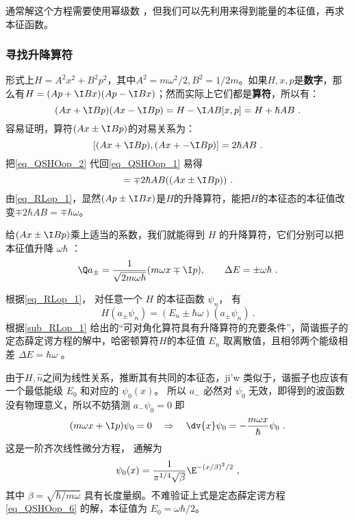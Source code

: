 通常解这个方程需要使用幂级数%
，但我们可以先利用来得到能量的本征值，再求本征函数。


\subsubsection{寻找升降算符}

形式上$H=A^2x^2+B^2p^2$，其中$A^2=m\omega^2/2, B^2=1/2m$。如果$H, x, p$是\textbf{数字}，那么有$H = (Ap+\I Bx)(Ap-\I Bx)$；然而实际上它们都是\textbf{算符}，所以有：
\begin{equation}\label{eq_QSHOop_1}
(Ax+\I Bp)(Ax-\I Bp) = H-\I AB[x, p] = H+\hbar AB~.
\end{equation}
容易证明，算符$(Ax\pm\I Bp)$的对易关系为：
\begin{equation}\label{eq_QSHOop_2}
[(Ax+\I Bp), (Ax+-\I Bp)] = 2\hbar AB~.
\end{equation}
把\autoref{eq_QSHOop_2} 代回\autoref{eq_QSHOop_1} 易得
\begin{equation}
[H, (Ax\pm\I Bp) = [H+ \hbar AB, (Ax\pm\I Bp)] = \mp 2\hbar AB ((Ax\pm\I Bp))~.
\end{equation}
由\autoref{eq_RLop_1}，显然$(Ap\pm \I Bx)$是$H$的升降算符，能把$H$的本征态的本征值改变$\mp 2\hbar AB=\mp \hbar \omega$。

给$(Ax\pm\I Bp)$乘上适当的系数，我们就能得到 $H$ 的升降算符，它们分别可以把本征值升降 $\omega\hbar$ ：
\begin{equation}
\Q a_\pm = \frac{1}{\sqrt{2m\omega\hbar}} (m\omega x \mp \I p), 
\qquad
\Delta E = \pm \omega \hbar~.
\end{equation}

根据\autoref{eq_RLop_1}， 对任意一个 $H$ 的本征函数 $\psi_n$， 有
\begin{equation}
H(a_\pm\psi_n) = (E_n\pm\hbar\omega) (a_ \pm \psi_n)~.
\end{equation}
根据\autoref{sub_RLop_1} 给出的“可对角化算符具有升降算符的充要条件”，简谐振子的定态薛定谔方程的解中，哈密顿算符$H$的本征值 $E_n$ 取离散值，且相邻两个能级相差 $\Delta E = \hbar \omega$ 。


由于$H,\hat n$之间为线性关系，推断其有共同的本征态，ji'w
类似于，谐振子也应该有一个最低能级 $E_0$ 和对应的 $\psi_0(x)$。 所以 $a_-$ 必然对 $\psi_0$ 无效，即得到的波函数没有物理意义，所以不妨猜测 $a_- \psi_0 = 0$ 
即
\begin{equation}
(m\omega x + \I p)\psi_0 = 0
\quad \Rightarrow \quad
\dv{x} \psi_0 =  - \frac{m\omega x}{\hbar } \psi_0~.
\end{equation}
这是一阶齐次线性微分方程，%
通解为
\begin{equation}
\psi_0(x) = \frac{1}{\pi^{1/4}\sqrt\beta} \E^{-(x/\beta)^2/2}~,
\end{equation}
其中 $\beta = \sqrt{\hbar /m\omega}$ 具有长度量纲。不难验证上式是定态薛定谔方程\autoref{eq_QSHOop_6} 的解，本征值为 $E_0=\omega\hbar/2$。



